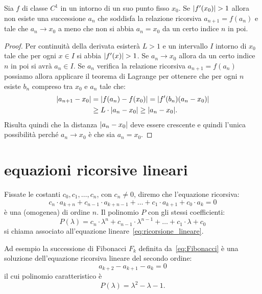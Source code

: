 \begin{theorem}
Sia $f$ di classe $C^1$ in un intorno di un suo punto fisso $x_0$.
Se ${\left|f'(x_0)\right|}>1$ allora non esiste una successione $a_n$ che soddisfa la relazione ricorsiva $a_{n+1} = f(a_n)$ e tale che $a_n \to x_0$ a meno che non si abbia $a_n = x_0$ da un certo indice $n$ in poi.
\end{theorem}
%
\begin{proof}
Per continuità della derivata esisterà $L>1$ e un intervallo $I$
intorno di $x_0$ tale che per ogni $x\in I$ si abbia ${\left|f'(x)\right|} > 1$.
Se $a_n \to x_0$ allora da un certo indice $n$
in poi si avrà $a_n \in I$.
Se $a_n$ verifica la relazione ricorsiva $a_{n+1} = f(a_n)$ possiamo
allora applicare il teorema di Lagrange per ottenere che per ogni $n$ esiste $b_n$ compreso tra $x_0$ e $a_n$ tale che:
\begin{align*}
  {\left|a_{n+1} - x_0\right|}
  &= {\left|f(a_n) - f(x_0)\right|}
  = {\left|f'(b_n)(a_n - x_0)\right|} \\
  &\ge L \cdot {\left|a_n - x_0\right|} \ge {\left|a_n - x_0\right|}.
\end{align*}
Risulta quindi che la distanza ${\left|a_n - x_0\right|}$ deve essere crescente
e quindi l'unica possibilità perché $a_n \to x_0$ è che sia $a_n = x_0$.
\end{proof}

\section{equazioni ricorsive lineari}
\label{sec:ricorrenza_lineare}

Fissate le costanti $c_0, c_1, \dots, c_n$,
con $c_n \neq 0$,
diremo che l'equazione ricorsiva:
\begin{equation}\label{eq:ricorsione_lineare}
  c_n \cdot a_{k+n} + c_{n-1} \cdot a_{k+n-1} + \dots
    + c_1 \cdot a_{k+1} + c_0 \cdot a_k = 0
\end{equation}
è una  (omogenea) di ordine $n$.
Il polinomio $P$ con gli stessi coefficienti:
\[
  P(\lambda) = c_n \cdot \lambda^n + c_{n-1}\cdot \lambda^{n-1} + \dots + c_1 \cdot \lambda + c_0
\]
si chiama 
%
%
associato all'equazione
lineare~\eqref{eq:ricorsione_lineare}.

Ad esempio la successione di Fibonacci $F_k$ definita da~\eqref{eq:Fibonacci}
è una soluzione dell'equazione ricorsiva lineare del secondo ordine:
\[
   a_{k+2} - a_{k+1} - a_{k} = 0
\]
il cui polinomio caratteristico è
\[
  P(\lambda) = \lambda^2 - \lambda - 1.
\]

